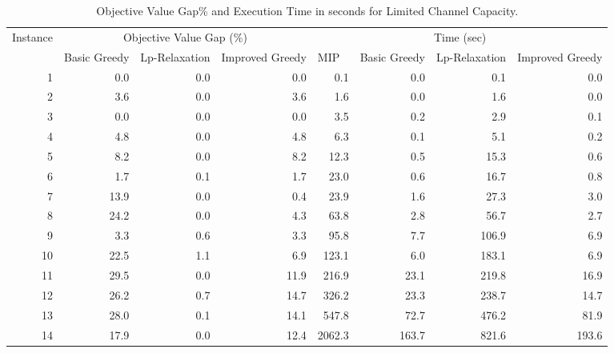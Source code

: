 \documentclass[11pt]{article}
\begin{document}
\begin{table}[htbp]
  \centering
  \caption{Objective Value Gap\% and Execution Time in seconds for Limited Channel Capacity.}\label{table:tbl_exact_limited_results}
    \begin{adjustbox}{max width=1\textwidth}
    \begin{tabular}{|l|rrr|rrrr|}
    \toprule
    \multicolumn{1}{|c|}{\multirow{2}[4]{*}{Instance}} & \multicolumn{3}{c|}{Objective Value Gap (\%)} & \multicolumn{4}{c|}{Time (sec)} \\
\cmidrule{2-8}          & \multicolumn{1}{l}{Basic Greedy} & \multicolumn{1}{l}{Lp-Relaxation} & \multicolumn{1}{l|}{Improved Greedy} & \multicolumn{1}{l}{MIP} & \multicolumn{1}{l}{Basic Greedy} & \multicolumn{1}{l}{Lp-Relaxation} & \multicolumn{1}{l|}{Improved Greedy} \\
    \midrule
    \multicolumn{1}{|r|}{1} & 0.0   & 0.0   & 0.0   & 0.1   & 0.0   & 0.1   & 0.0 \\
    \multicolumn{1}{|r|}{2} & 3.6   & 0.0   & 3.6   & 1.6   & 0.0   & 1.6   & 0.0 \\
    \multicolumn{1}{|r|}{3} & 0.0   & 0.0   & 0.0   & 3.5   & 0.2   & 2.9   & 0.1 \\
    \multicolumn{1}{|r|}{4} & 4.8   & 0.0   & 4.8   & 6.3   & 0.1   & 5.1   & 0.2 \\
    \multicolumn{1}{|r|}{5} & 8.2   & 0.0   & 8.2   & 12.3  & 0.5   & 15.3  & 0.6 \\
    \multicolumn{1}{|r|}{6} & 1.7   & 0.1   & 1.7   & 23.0  & 0.6   & 16.7  & 0.8 \\
    \multicolumn{1}{|r|}{7} & 13.9  & 0.0   & 0.4   & 23.9  & 1.6   & 27.3  & 3.0 \\
    \multicolumn{1}{|r|}{8} & 24.2  & 0.0   & 4.3   & 63.8  & 2.8   & 56.7  & 2.7 \\
    \multicolumn{1}{|r|}{9} & 3.3   & 0.6   & 3.3   & 95.8  & 7.7   & 106.9 & 6.9 \\
    \multicolumn{1}{|r|}{10} & 22.5  & 1.1   & 6.9   & 123.1 & 6.0   & 183.1 & 6.9 \\
    \multicolumn{1}{|r|}{11} & 29.5  & 0.0   & 11.9  & 216.9 & 23.1  & 219.8 & 16.9 \\
    \multicolumn{1}{|r|}{12} & 26.2  & 0.7   & 14.7  & 326.2 & 23.3  & 238.7 & 14.7 \\
    \multicolumn{1}{|r|}{13} & 28.0  & 0.1   & 14.1  & 547.8 & 72.7  & 476.2 & 81.9 \\
    \multicolumn{1}{|r|}{14} & 17.9  & 0.0   & 12.4  & 2062.3 & 163.7 & 821.6 & 193.6 \\

\end{tabular}
\end{adjustbox}
\end{table}
\end{document}
